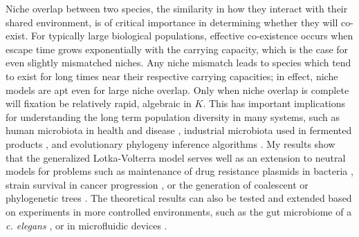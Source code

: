 Niche overlap between two species, the similarity in how they interact with their shared environment, is of critical importance in determining whether they will co-exist. 
For typically large biological populations, effective co-existence occurs when escape time grows exponentially with the carrying capacity, which is the case for even slightly mismatched niches. 
Any niche mismatch leads to species which tend to exist for long times near their respective carrying capacities; in effect, niche models are apt even for large niche overlap. 
Only when niche overlap is complete will fixation be relatively rapid, algebraic in $K$. 
This has important implications for understanding the long term population diversity in many systems, such as human microbiota in health and disease \cite{Coburn2015,Palmer2001,Kinross2011}, industrial microbiota used in fermented products \cite{Wolfe2014}, and evolutionary phylogeny inference algorithms \cite{Rice2004,Blythe2007}. 
My results show that the generalized Lotka-Volterra model serves well as an extension to neutral models for problems such as maintenance of drug resistance plasmids in bacteria \cite{Gooding-townsend2015}, strain survival in cancer progression \cite{Ashcroft2015}, or the generation of coalescent or phylogenetic trees \cite{Kingman1982,Rice2004,Rogers2014}. 
The theoretical results can also be tested and extended based on experiments in more controlled environments, such as the gut microbiome of a \textit{c. elegans} \cite{Vega2017}, or in microfluidic devices \cite{Hung2005}. %


